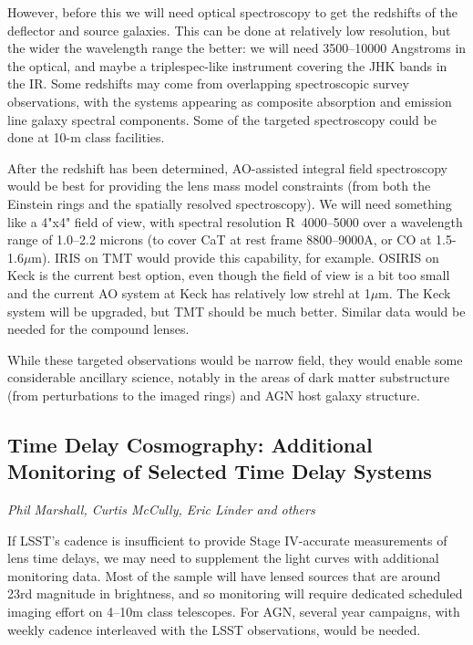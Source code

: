 However, before this we will need optical spectroscopy to get the redshifts
of the deflector and source galaxies. This can be done at relatively low
resolution, but the wider the wavelength range the better: we will need
3500--10000 Angstroms in the optical, and maybe a triplespec-like instrument covering the JHK
bands in the IR. Some redshifts may come from overlapping
spectroscopic survey observations, with the systems appearing as
composite absorption and emission line galaxy spectral components. Some
of the targeted spectroscopy could be done at 10-m class facilities.

After the redshift has been determined, AO-assisted integral field
spectroscopy would be best for providing the lens mass model
constraints (from both the Einstein rings and the spatially resolved
spectroscopy). We will need something like a 4"x4" field of view, with
spectral resolution R~4000--5000 over a wavelength range of 1.0--2.2 microns
(to cover CaT at rest frame  8800--9000A, or CO at 1.5-1.6$\mu$m). IRIS
on TMT would provide this capability, for example. OSIRIS on Keck is the current
best option, even though the field of view is a bit too small and the
current AO system at Keck has relatively low strehl at 1$\mu$m. The Keck
system will be upgraded, but TMT should be much better. 
Similar data would be needed for the compound lenses.

While these targeted observations would be narrow field, they would
enable some considerable ancillary science, notably  in the areas of
dark matter substructure (from perturbations to the imaged rings) and
AGN host galaxy structure.


\subsection{Time Delay Cosmography: Additional Monitoring of Selected Time Delay Systems}
{\it Phil Marshall, Curtis McCully, Eric Linder and others}

If LSST's cadence is insufficient to provide Stage IV-accurate
measurements of lens time delays, we may need to supplement the light
curves with additional monitoring data. Most of the sample will have
lensed sources that are around 23rd magnitude in brightness, and so
monitoring will require dedicated scheduled imaging effort on 4--10m
class telescopes. For AGN, several year campaigns, with
weekly cadence interleaved with the LSST observations, would be needed.

